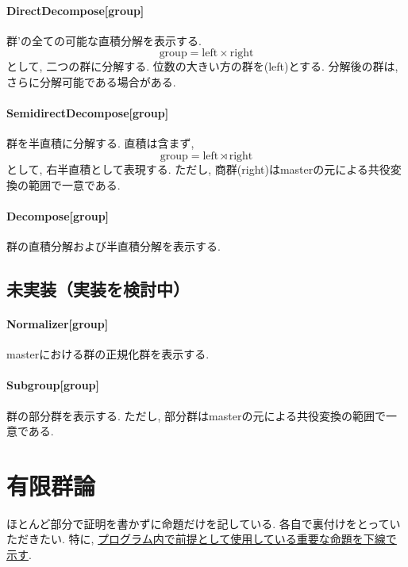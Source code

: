 \documentclass[11pt, a4paper]{jsarticle}
\begin{document}
\paragraph{DirectDecompose[group]}
群'の全ての可能な直積分解を表示する.
\begin{equation}
\text{group} = \text{left} \times \text{right}
\end{equation}
として, 二つの群に分解する.
位数の大きい方の群を(left)とする.
分解後の群は, さらに分解可能である場合がある.

\paragraph{SemidirectDecompose[group]}
群を半直積に分解する.
直積は含まず,
\begin{equation}
\text{group} = \text{left} \rtimes \text{right}
\end{equation}
として, 右半直積として表現する.
ただし, 商群(right)はmasterの元による共役変換の範囲で一意である.

\paragraph{Decompose[group]}
群の直積分解および半直積分解を表示する.

\subsection{未実装（実装を検討中）}

\paragraph{Normalizer[group]}
masterにおける群の正規化群を表示する.

\paragraph{Subgroup[group]}
群の部分群を表示する.
ただし, 部分群はmasterの元による共役変換の範囲で一意である.

\newpage
\section{有限群論}
ほとんど部分で証明を書かずに命題だけを記している.
各自で裏付けをとっていただきたい.
特に, \uline{プログラム内で前提として使用している重要な命題を下線で示す}.
\end{document}
